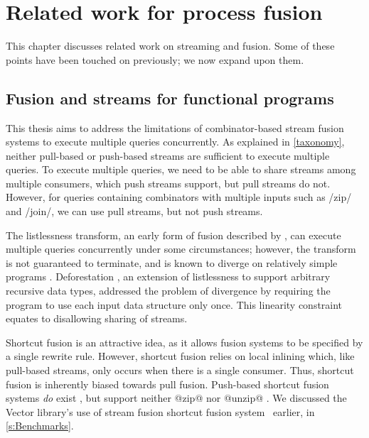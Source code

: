 \chapter{Related work for process fusion}
\label{related}

This chapter discusses related work on streaming and fusion.
Some of these points have been touched on previously; we now expand upon them.

\section{Fusion and streams for functional programs}
\label{related/fusion}
\label{related/stream-fusion}

This thesis aims to address the limitations of combinator-based stream fusion systems to execute multiple queries concurrently.
As explained in \cref{taxonomy}, neither pull-based or push-based streams are sufficient to execute multiple queries.
To execute multiple queries, we need to be able to share streams among multiple consumers, which push streams support, but pull streams do not.
However, for queries containing combinators with multiple inputs such as \Hs/zip/ and \Hs/join/, we can use pull streams, but not push streams.

The listlessness transform, an early form of fusion described by \citet{wadler1984listlessness}, can execute multiple queries concurrently under some circumstances; however, the transform is not guaranteed to terminate, and is known to diverge on relatively simple programs \citep{caspi1996synchronous}.
Deforestation \citep{wadler1990deforestation}, an extension of listlessness to support arbitrary recursive data types, addressed the problem of divergence by requiring the program to use each input data structure only once.
This linearity constraint equates to disallowing sharing of streams.

Shortcut fusion is an attractive idea, as it allows fusion systems to be specified by a single rewrite rule.
However, shortcut fusion relies on local inlining which, like pull-based streams, only occurs when there is a single consumer.
Thus, shortcut fusion is inherently biased towards pull fusion.
Push-based shortcut fusion systems \emph{do} exist \cite{gill1993short}, but support neither @zip@ nor @unzip@ \cite{svenningsson2002shortcut,lippmeier2013data}.
We discussed the Vector library's use of stream fusion shortcut fusion system~\cite{coutts2007stream} earlier, in \cref{s:Benchmarks}.


